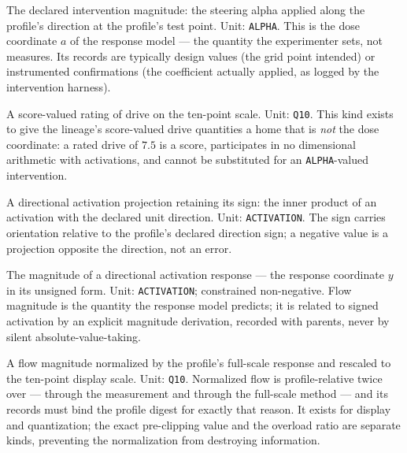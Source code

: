 \begin{definition}\label{ch03:qk:driveint}
The declared intervention magnitude: the steering alpha applied along the profile's direction at the profile's test point. Unit: \texttt{ALPHA}. This is the dose coordinate $a$ of the response model --- the quantity the experimenter sets, not measures. Its records are typically design values (the grid point intended) or instrumented confirmations (the coefficient actually applied, as logged by the intervention harness).
\end{definition}

\begin{definition}\label{ch03:qk:drivescore}
A score-valued rating of drive on the ten-point scale. Unit: \texttt{Q10}. This kind exists to give the lineage's score-valued drive quantities a home that is \emph{not} the dose coordinate: a rated drive of $7.5$ is a score, participates in no dimensional arithmetic with activations, and cannot be substituted for an \texttt{ALPHA}-valued intervention.
\end{definition}

\begin{definition}\label{ch03:qk:signedact}
A directional activation projection retaining its sign: the inner product of an activation with the declared unit direction. Unit: \texttt{ACTIVATION}. The sign carries orientation relative to the profile's declared direction sign; a negative value is a projection opposite the direction, not an error.
\end{definition}

\begin{definition}\label{ch03:qk:flowmag}
The magnitude of a directional activation response --- the response coordinate $y$ in its unsigned form. Unit: \texttt{ACTIVATION}; constrained non-negative. Flow magnitude is the quantity the response model predicts; it is related to signed activation by an explicit magnitude derivation, recorded with parents, never by silent absolute-value-taking.
\end{definition}

\begin{definition}\label{ch03:qk:normflow}
A flow magnitude normalized by the profile's full-scale response and rescaled to the ten-point display scale. Unit: \texttt{Q10}. Normalized flow is profile-relative twice over --- through the measurement and through the full-scale method --- and its records must bind the profile digest for exactly that reason. It exists for display and quantization; the exact pre-clipping value and the overload ratio are separate kinds, preventing the normalization from destroying information.
\end{definition}


